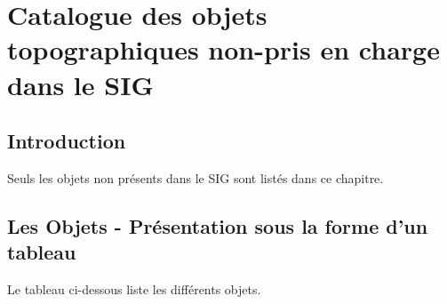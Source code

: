 \documentclass[12pt,titlepage]{book}
\begin{document}
\chapter{Catalogue des objets topographiques non-pris en charge dans le SIG}

\section{Introduction}
Seuls les objets non présents dans le SIG sont listés dans ce chapitre.


\section{Les Objets - Présentation sous la forme d'un tableau}
Le tableau ci-dessous liste les différents objets.
\vspace{\baselineskip}
\end{document}
